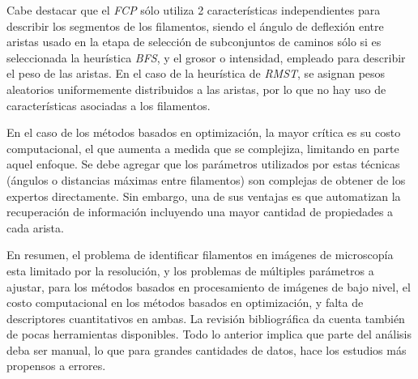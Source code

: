     

Cabe destacar que el {\it FCP} s\'olo utiliza 2 caracter\'isticas independientes para describir los segmentos de los filamentos, siendo el \'angulo de deflexi\'on entre aristas usado en la etapa de selecci\'on de subconjuntos de caminos s\'olo si es seleccionada la heur\'istica {\it BFS}, y el grosor o intensidad, empleado para describir el peso de las aristas. En el caso de la heur\'istica de {\it RMST}, se asignan pesos aleatorios uniformemente distribuidos a las aristas, por lo que no hay uso de caracter\'isticas asociadas a los filamentos.



En el caso de los m\'etodos basados en optimizaci\'on, la mayor cr\'itica es su costo computacional, el que aumenta a medida que se complejiza, limitando en parte aquel enfoque. Se debe agregar que los par\'ametros utilizados por estas t\'ecnicas (\'angulos o  distancias m\'aximas entre filamentos) son complejas de obtener de los expertos directamente. Sin embargo, una de sus ventajas es que automatizan la recuperaci\'on de informaci\'on incluyendo una mayor cantidad de propiedades a cada arista. 


En resumen, el problema de identificar filamentos en im\'agenes de microscop\'ia esta limitado por la resoluci\'on, y los problemas de m\'ultiples par\'ametros a ajustar, para los m\'etodos basados en procesamiento de im\'agenes de bajo nivel, el costo computacional en los m\'etodos basados en optimizaci\'on, y falta de descriptores cuantitativos en ambas. La revisi\'on bibliogr\'afica da cuenta tambi\'en de pocas herramientas disponibles. Todo lo anterior implica que parte del an\'alisis deba ser manual, lo que para grandes cantidades de datos, hace los estudios m\'as propensos a errores. 



